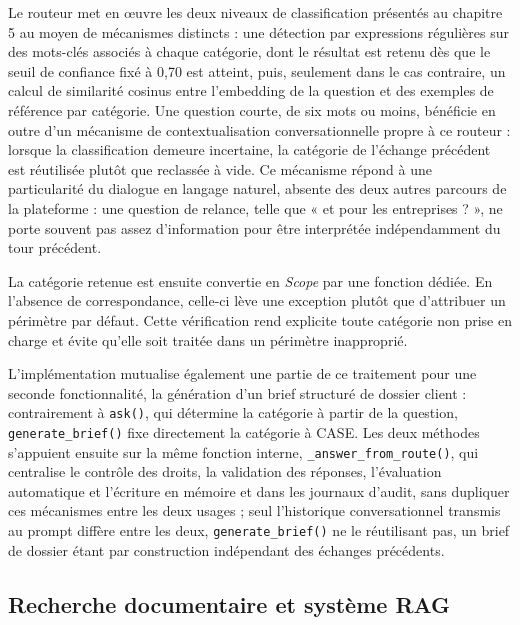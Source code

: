 Le routeur met en œuvre les deux niveaux de classification présentés au chapitre 5 au moyen de mécanismes distincts : une détection par expressions régulières sur des mots-clés associés à chaque catégorie, dont le résultat est retenu dès que le seuil de confiance fixé à 0,70 est atteint, puis, seulement dans le cas contraire, un calcul de similarité cosinus entre l'embedding de la question et des exemples de référence par catégorie. Une question courte, de six mots ou moins, bénéficie en outre d'un mécanisme de contextualisation conversationnelle propre à ce routeur : lorsque la classification demeure incertaine, la catégorie de l'échange précédent est réutilisée plutôt que reclassée à vide. Ce mécanisme répond à une particularité du dialogue en langage naturel, absente des deux autres parcours de la plateforme : une question de relance, telle que « et pour les entreprises ? », ne porte souvent pas assez d'information pour être interprétée indépendamment du tour précédent.

La catégorie retenue est ensuite convertie en \textit{Scope} par une fonction dédiée. En l'absence de correspondance, celle-ci lève une exception plutôt que d'attribuer un périmètre par défaut. Cette vérification rend explicite toute catégorie non prise en charge et évite qu'elle soit traitée dans un périmètre inapproprié.

L'implémentation mutualise également une partie de ce traitement pour une seconde fonctionnalité, la génération d'un brief structuré de dossier client : contrairement à \texttt{ask()}, qui détermine la catégorie à partir de la question, \texttt{generate\_brief()} fixe directement la catégorie à CASE. Les deux méthodes s'appuient ensuite sur la même fonction interne, \texttt{\_answer\_from\_route()}, qui centralise le contrôle des droits, la validation des réponses, l'évaluation automatique et l'écriture en mémoire et dans les journaux d'audit, sans dupliquer ces mécanismes entre les deux usages ; seul l'historique conversationnel transmis au prompt diffère entre les deux, \texttt{generate\_brief()} ne le réutilisant pas, un brief de dossier étant par construction indépendant des échanges précédents.

\subsection{Recherche documentaire et système RAG}

